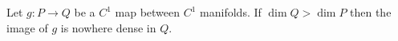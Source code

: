 Let $g: P \to Q$ be a $C^1$ map between $C^1$ manifolds. If $\dim Q > \dim P$ then the image of $g$ is nowhere dense in $Q$.
